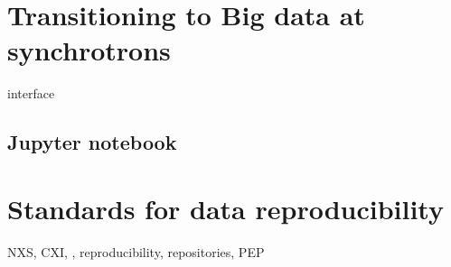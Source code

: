 \section{Transitioning to Big data at synchrotrons}
interface

\subsection{Jupyter notebook}
\lipsum

\section{Standards for data reproducibility}

\lipsum
NXS, CXI, , reproducibility, repositories, PEP
